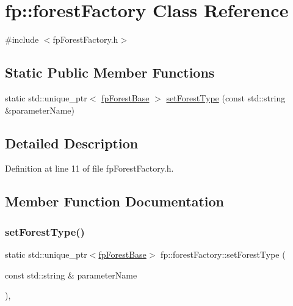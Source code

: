 \hypertarget{classfp_1_1forestFactory}{}\section{fp\+:\+:forest\+Factory Class Reference}
\label{classfp_1_1forestFactory}


{\ttfamily \#include $<$fp\+Forest\+Factory.\+h$>$}

\subsection*{Static Public Member Functions}
\begin{DoxyCompactItemize}
\item 
static std\+::unique\+\_\+ptr$<$ \hyperlink{classfp_1_1fpForestBase}{fp\+Forest\+Base} $>$ \hyperlink{classfp_1_1forestFactory_a856050d77f96dd155d41b95684552c20}{set\+Forest\+Type} (const std\+::string \&parameter\+Name)
\end{DoxyCompactItemize}


\subsection{Detailed Description}


Definition at line 11 of file fp\+Forest\+Factory.\+h.



\subsection{Member Function Documentation}
\mbox{\label{classfp_1_1forestFactory_a856050d77f96dd155d41b95684552c20}} 
\subsubsection{\texorpdfstring{set\+Forest\+Type()}{setForestType()}}
{\footnotesize\ttfamily static std\+::unique\+\_\+ptr$<$\hyperlink{classfp_1_1fpForestBase}{fp\+Forest\+Base}$>$ fp\+::forest\+Factory\+::set\+Forest\+Type (\begin{DoxyParamCaption}\item[{const std\+::string \&}]{parameter\+Name }\end{DoxyParamCaption})\hspace{0.3cm}{\ttfamily [inline]}, {\ttfamily [static]}}



